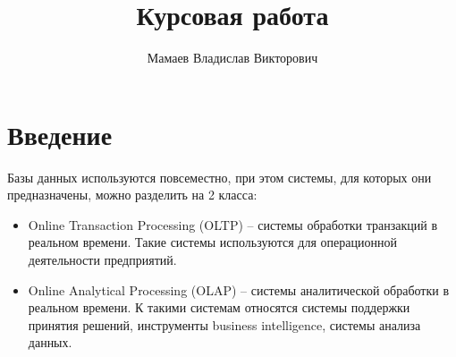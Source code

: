 \documentclass[%
bachelor,    %
subf,        %
href,        %
colorlinks,  %
]{disser}
\begin{document}

%
%



\title{Курсовая работа}


\author{Мамаев Владислав Викторович}


\date{\number\year}

\maketitle

%
%
%
%
%
%
%
%
%
%
%

\tableofcontents


\section{Введение}
  
Базы данных используются повсеместно, при этом системы, для которых они предназначены, можно разделить на 2 класса:
\begin{itemize}
\item Online Transaction Processing (OLTP) -- системы обработки транзакций в реальном времени. Такие системы используются для операционной деятельности предприятий.
\item Online Analytical Processing (OLAP) -- системы аналитической обработки в реальном времени. К такими системам относятся системы поддержки принятия решений, инструменты business intelligence, системы анализа данных.
\end{itemize}
\end{document}
